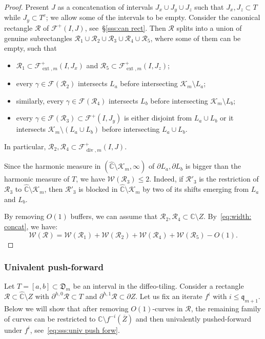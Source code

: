 \documentclass{amsart}
\newcommand{\1}{{\mathbb 1 }}
\newcommand{\ext}{{\operatorname{ext}}}
\renewcommand{\div}{{\operatorname{div}}}
\newcommand{\Fam}{{\mathcal F}}
\newcommand{\Width}{{\mathcal W}}
\newcommand\RR{\mathcal{R}}
\newcommand{\qq}{\mathfrak{q}}
\newcommand{\wC}{\widehat{\mathbb{C}}}
\newcommand{\C}{\mathbb{C}}
\newcommand{\Dbb}{{\mathfrak{D}}}
\theoremstyle{remark}
\numberwithin{equation}{section}
\theoremstyle{definition}
\newcommand{\filled}{{\mathcal {K} }}
\begin{document}
\begin{proof}
 Present $J$ as a concatenation of intervals $J_x\cup J_y\cup J_z$ such that $J_x,J_z\subset T$ while $J_y\subset T^c$;  we allow some of the intervals to be empty. Consider the canonical rectangle $\RR$ of $\Fam^+(I,J)$, see~\S\ref{sss:can rect}. Then $\RR$ splits into a union of genuine subrectangles $\RR_1\cup \RR_2\cup \RR_3\cup \RR_4\cup \RR_5$, where some of them can be empty, such that
\begin{itemize}
\item $\RR_1\subset \Fam^+_{\ext,m}(I,J_x)$ and $\RR_5\subset \Fam^+_{\ext,m}(I,J_z)$;
\item every $\gamma\in \Fam(\RR_2)$ intersects $L_a$ before intersecting $\filled_m\setminus L_a$; 
\item similarly, every $\gamma\in \Fam(\RR_4)$ intersects $L_b$ before intersecting $\filled_m\setminus L_b$; 
\item every $\gamma\in \Fam(\RR_3)\subset \Fam^+(I,J_y)$ is either disjoint from $L_a\cup L_b$ or it intersects $\filled_m\setminus (L_a\cup L_b)$ before intersecting $L_a\cup L_b$.
\end{itemize}
In particular, $\RR_2,\RR_4\subset \Fam^+_{\div, m}(I,J)$.

Since the harmonic measure in $(\wC\setminus \filled_m,\infty) $ of $\partial L_a,\partial L_b$ is bigger than the harmonic measure of $T$, we have $\Width(\RR_3)\le 2$. Indeed, if $\RR'_3$ is the restriction of $\RR_3$ to $\wC\setminus \filled_m$, then $\RR'_3$ is blocked in $\wC\setminus \filled_m$ by two of its shifts emerging from $L_a$ and $L_b$.

 By removing $O(1)$ buffers, we can assume that $\RR_2,\RR_4\subset \C\setminus Z$. By~\eqref{eq:width: concat}, we have:
\[\Width(\RR) =\Width(\RR_1)+\Width(\RR_2)+\Width(\RR_4)+\Width(\RR_5)-O(1).\]
\end{proof}



\subsubsection{Univalent push-forward}\label{sss:univ push forw}  Let $T=[a,b]\subset \Dbb_m$ be an interval in the diffeo-tiling. Consider a rectangle $\RR\subset \wC\setminus Z$ with $\partial^{h,0} \RR\subset T$ and $\partial^{h,1} \RR\subset \partial Z$. Let us fix an iterate $f^i$ with $i\le \qq_{m+1}$. Below we will show that after removing $O(1)$-curves in $\RR$, the remaining family of curves can be restricted to $\C\setminus f^{-i}( \overline Z)$ and then univalently pushed-forward under $f^i$, see~\eqref{eq:sss:univ push forw}.
\end{document}

